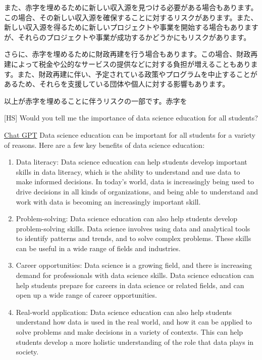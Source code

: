 \documentclass[
]{book}
\providecommand{\tightlist}{%
  \setlength{\itemsep}{0pt}\setlength{\parskip}{0pt}}
\theoremstyle{definition}
\theoremstyle{definition}
\theoremstyle{definition}
\theoremstyle{definition}
\theoremstyle{remark}
\begin{document}
また、赤字を埋めるために新しい収入源を見つける必要がある場合もあります。この場合、その新しい収入源を確保することに対するリスクがあります。また、新しい収入源を得るために新しいプロジェクトや事業を開始する場合もありますが、それらのプロジェクトや事業が成功するかどうかにもリスクがあります。

さらに、赤字を埋めるために財政再建を行う場合もあります。この場合、財政再建によって税金や公的なサービスの提供などに対する負担が増えることもあります。また、財政再建に伴い、予定されている政策やプログラムを中止することがあるため、それらを支援している団体や個人に対する影響もあります。

以上が赤字を埋めることに伴うリスクの一部です。赤字を

{[}HS{]} Would you tell me the importance of data science education for all students?

\protect\hyperlink{chatgpt}{Chat GPT} Data science education can be important for all students for a variety of reasons. Here are a few key benefits of data science education:

\begin{enumerate}
\def\labelenumi{\arabic{enumi}.}
\tightlist
\item
  Data literacy: Data science education can help students develop important skills in data literacy, which is the ability to understand and use data to make informed decisions. In today's world, data is increasingly being used to drive decisions in all kinds of organizations, and being able to understand and work with data is becoming an increasingly important skill.
\item
  Problem-solving: Data science education can also help students develop problem-solving skills. Data science involves using data and analytical tools to identify patterns and trends, and to solve complex problems. These skills can be useful in a wide range of fields and industries.
\item
  Career opportunities: Data science is a growing field, and there is increasing demand for professionals with data science skills. Data science education can help students prepare for careers in data science or related fields, and can open up a wide range of career opportunities.
\item
  Real-world application: Data science education can also help students understand how data is used in the real world, and how it can be applied to solve problems and make decisions in a variety of contexts. This can help students develop a more holistic understanding of the role that data plays in society.
\end{enumerate}
\end{document}

